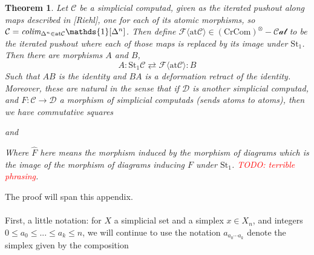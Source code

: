 \documentclass[12pt]{article}
\newtheorem{theorem}{Theorem}[section]
\theoremstyle{definition}
\newcommand{\TODO}[1]{\textcolor{red}{TODO: {#1}}}
\newcommand{\C}{\mathcal{C}}
\newcommand{\D}{\mathcal{D}}
\newcommand{\crcom}{\text{CrCom}}
\newcommand{\tensorcrossedcat}{(\crcom)^\otimes-\mathcal{Cat}}
\newcommand{\colim}{\emph{colim}}
\begin{document}
\begin{theorem}
	Let $\C$ be a simplicial computad, given as the iterated pushout along maps described in [Riehl], one for each of its atomic morphisms, so $\C = \colim_{\Delta^n \in \text{at}\C }\mathds{1}[\Delta^n]$. Then define $\mathcal{F}\langle \text{at}\C\rangle \in \tensorcrossedcat$ to be the iterated pushout where each of those maps is replaced by its image under $\text{St}_1$. Then there are morphisms $A$ and $B$,
	$$A: \text{St}_1\C \rightleftarrows \mathcal{F}\langle\text{at} \C \rangle: B$$
	Such that $AB$ is the identity and $BA$ is a deformation retract of the identity. Moreover, these are natural in the sense that if $\D$ is another simplicial computad, and $F: \C \to \D$ a morphism of simplicial computads (sends atoms to atoms), then we have commutative squares 
	\begin{center}
	\end{center}
	and
	\begin{center}
	\end{center}
	Where $\hat{F}$ here means the morphism induced by the morphism of diagrams which is the image of the morphism of diagrams inducing $F$ under $\text{St}_1$. \TODO{terrible phrasing}.
\end{theorem}
The proof will span this appendix.
\\\\
First, a little notation: for $X$ a simplicial set and a simplex $x \in X_n$, and integers $0\le a_0 \le ... \le a_k \le n$, we will continue to use the notation $a_{a_0\cdots a_k}$ denote the simplex given by the composition
\begin{center}
\end{center}
\end{document}
